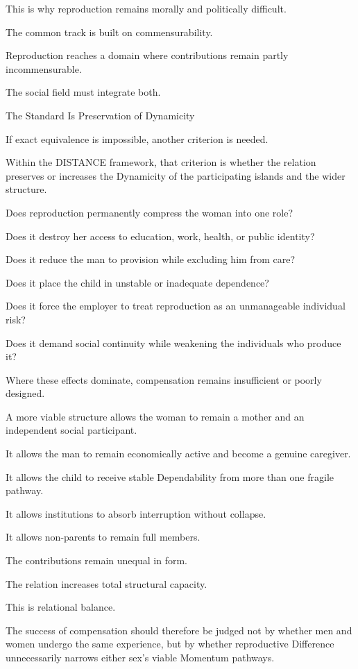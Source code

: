 This is why reproduction remains morally and politically difficult.

The common track is built on commensurability.

Reproduction reaches a domain where contributions remain partly incommensurable.

The social field must integrate both.

The Standard Is Preservation of Dynamicity

If exact equivalence is impossible, another criterion is needed.

Within the DISTANCE framework, that criterion is whether the relation preserves or increases the Dynamicity of the participating islands and the wider structure.

Does reproduction permanently compress the woman into one role?

Does it destroy her access to education, work, health, or public identity?

Does it reduce the man to provision while excluding him from care?

Does it place the child in unstable or inadequate dependence?

Does it force the employer to treat reproduction as an unmanageable individual risk?

Does it demand social continuity while weakening the individuals who produce it?

Where these effects dominate, compensation remains insufficient or poorly designed.

A more viable structure allows the woman to remain a mother and an independent social participant.

It allows the man to remain economically active and become a genuine caregiver.

It allows the child to receive stable Dependability from more than one fragile pathway.

It allows institutions to absorb interruption without collapse.

It allows non-parents to remain full members.

The contributions remain unequal in form.

The relation increases total structural capacity.

This is relational balance.

The success of compensation should therefore be judged not by whether men and women undergo the same experience, but by whether reproductive Difference unnecessarily narrows either sex’s viable Momentum pathways.

